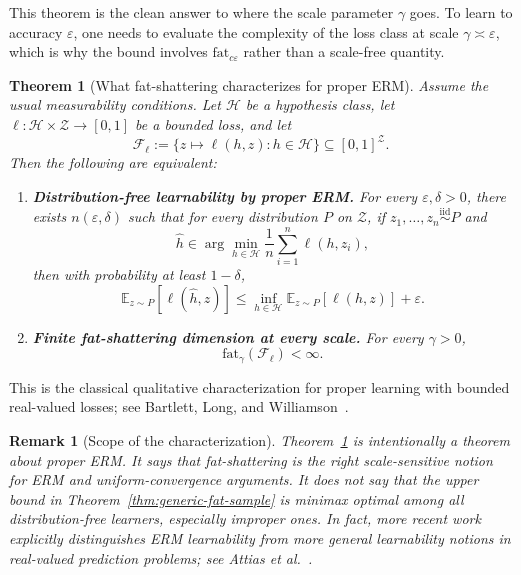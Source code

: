 \documentclass[11pt]{article}
\newtheorem{theorem}{Theorem}
\newtheorem{remark}{Remark}
\theoremstyle{definition}
\newcommand{\E}{\mathbb{E}}
\begin{document}
This theorem is the clean answer to where the scale parameter $\gamma$ goes. To learn to accuracy $\varepsilon$, one needs to evaluate the complexity of the loss class at scale $\gamma \asymp \varepsilon$, which is why the bound involves $\mathrm{fat}_{c\varepsilon}$ rather than a scale-free quantity.

\begin{theorem}[What fat-shattering characterizes for proper ERM]
\label{thm:generic-fat-erm}
Assume the usual measurability conditions. Let $\mathcal{H}$ be a hypothesis class, let $\ell : \mathcal{H} \times \mathcal{Z} \to [0,1]$ be a bounded loss, and let
\[
\mathcal{F}_{\ell}
:=
\{z \mapsto \ell(h,z) : h \in \mathcal{H}\}
\subseteq [0,1]^{\mathcal{Z}}.
\]
Then the following are equivalent:
\begin{enumerate}[label=(\roman*)]
\item \textbf{Distribution-free learnability by proper ERM.} For every $\varepsilon,\delta > 0$, there exists $n(\varepsilon,\delta)$ such that for every distribution $P$ on $\mathcal{Z}$, if $z_1,\dots,z_n \overset{\mathrm{iid}}{\sim} P$ and
\[
\widehat{h}
\in
\arg\min_{h \in \mathcal{H}} \frac{1}{n}\sum_{i=1}^n \ell(h,z_i),
\]
then with probability at least $1-\delta$,
\[
\E_{z \sim P}[\ell(\widehat{h},z)]
\le
\inf_{h \in \mathcal{H}} \E_{z \sim P}[\ell(h,z)] + \varepsilon.
\]

\item \textbf{Finite fat-shattering dimension at every scale.} For every $\gamma > 0$,
\[
\mathrm{fat}_{\gamma}(\mathcal{F}_{\ell}) < \infty.
\]
\end{enumerate}
\end{theorem}

This is the classical qualitative characterization for proper learning with bounded real-valued losses; see Bartlett, Long, and Williamson~\cite{bartlett1996}.

\begin{remark}[Scope of the characterization]
\label{rem:generic-fat-caution}
Theorem~\ref{thm:generic-fat-erm} is intentionally a theorem about \emph{proper ERM}. It says that fat-shattering is the right scale-sensitive notion for ERM and uniform-convergence arguments. It does \emph{not} say that the upper bound in Theorem~\ref{thm:generic-fat-sample} is minimax optimal among all distribution-free learners, especially improper ones. In fact, more recent work explicitly distinguishes ERM learnability from more general learnability notions in real-valued prediction problems; see Attias et al.~\cite{attias2024}.
\end{remark}
\end{document}
